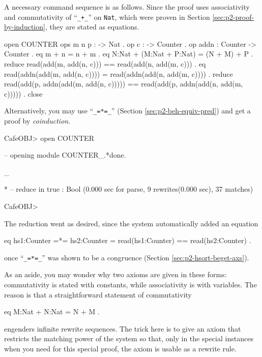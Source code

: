 \documentclass[a4paper]{memoir}
\begin{document}
A necessary command sequence is as follows. Since the proof
uses associativity and commutativity of ``\verb|_+_|'' on \verb|Nat|,
which were proven
in Section \ref{sec:p2-proof-by-induction}, they are stated as equations.
\begin{vvtm}
\begin{ccode}
  open COUNTER
  ops m n p : -> Nat .
  op c : -> Counter .
  op addn : Counter -> Counter .
  eq m + n = n + m .
  eq N:Nat + (M:Nat + P:Nat) = (N + M) + P .
  reduce read(add(m, add(n, c))) == read(add(n, add(m, c))) .
  eq read(addn(add(m, add(n, c)))) = read(addn(add(n, add(m, c)))) .
  reduce read(add(p, addn(add(m, add(n, c))))) ==
         read(add(p, addn(add(n, add(m, c))))) .
  close
\end{ccode}
\end{vvtm}
Alternatively, you may use ``\verb|_=*=_|''
(Section \ref{sec:p2-beh-equiv-pred})
and get a proof by {\em coinduction}.
\begin{vvtm}
\begin{ccode}
  CafeOBJ> open COUNTER

  -- opening module COUNTER_.*done.



  _


  *
  -- reduce in %
  true : Bool
  (0.000 sec for parse, 9 rewrites(0.000 sec), 37 matches)

  CafeOBJ> 
\end{ccode}
\end{vvtm}
The reduction went as desired, since the system automatically
added an equation
\begin{vvtm}
\begin{ccode}
  eq hs1:Counter =*= hs2:Counter = read(hs1:Counter) == read(hs2:Counter) .
\end{ccode}
\end{vvtm}
once ``\verb|_=*=_|'' was shown to be a congruence
(Section \ref{sec:p2-hsort-beget-axs}).

As an aside, you may wonder why two axioms are given in these forms:
commutativity is stated with constants, while associativity is with
variables. The reason is that a straightforward statement of commutativity
\begin{vvtm}
\begin{ccode}
  eq M:Nat + N:Nat = N + M .
\end{ccode}
\end{vvtm}
engenders infinite rewrite sequences. The trick here is to give an
axiom that restricts the matching power of the system so that,
only in the special instances when you need for this special proof,
the axiom is usable as a rewrite rule.
\end{document}
